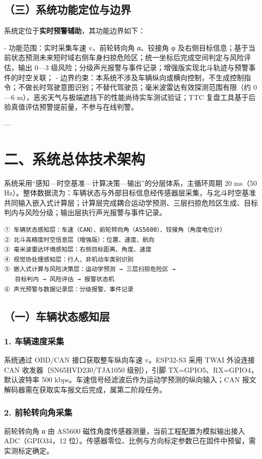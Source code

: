 \documentclass[UTF8,11pt]{ctexart}
\begin{document}
\subsection*{（三）系统功能定位与边界}
系统定位于\textbf{实时预警辅助}，其功能边界如下：

- 功能范围：实时采集车速 v、前轮转向角 α、铰接角 φ 及右侧目标信息；基于当前状态预测未来短时域右侧车身扫掠危险区；统一坐标后完成空间判定与风险评估，输出 0—3 级风险；分级声光报警与事件记录；增强版实现北斗轨迹与预警事件的时空关联； - 边界约束：本系统不涉及车辆纵向或横向控制，不生成控制指令；不做长时驾驶意图识别；不替代驾驶员；毫米波雷达有效探测范围有限（约 0—6 m），恶劣天气与极端遮挡下的性能尚待实车测试验证；TTC 复盘工具基于后验真值评估预警提前量，不参与在线判警。

---

\section*{二、系统总体技术架构}
系统采用“感知—时空基准—计算决策—输出”的分层体系，主循环周期 20 ms（50 Hz）。整体数据流为：车辆状态与外部目标信息经传感器层采集，与北斗时空基准共同输入嵌入式计算层；计算层完成耦合运动学预测、三层扫掠危险区生成、目标判内与风险分级；输出层执行声光报警与事件记录。

\begin{verbatim}
① 车辆状态感知层：车速（CAN）、前轮转向角（AS5600）、铰接角（角度电位计）
② 北斗高精度时空信息层（增强版）：位置、速度、航向
③ 毫米波雷达环境感知层：右侧目标距离、角度、速度
④ 视觉协处理感知层：行人、非机动车类别识别
⑤ 嵌入式计算与风险决策层：运动学预测 → 三层扫掠危险区 →
   目标判内 → 风险评估 → 报警状态机
⑥ 声光预警与数据记录层：分级报警、事件记录
\end{verbatim}
\subsection*{（一）车辆状态感知层}
\subsubsection*{1. 车辆速度采集}
系统通过 OBD/CAN 接口获取整车纵向车速 v。ESP32-S3 采用 TWAI 外设连接 CAN 收发器（SN65HVD230/TJA1050 级别），引脚 TX=GPIO5、RX=GPIO4，默认波特率 500 kbps。车速信号经滤波后作为运动学预测的纵向输入；CAN 报文解码器需在获取实车报文后完成，属第二阶段任务。

\subsubsection*{2. 前轮转向角采集}
前轮转向角 α 由 AS5600 磁性角度传感器测量，当前工程配置为模拟输出接入 ADC（GPIO34，12 位）。传感器零位、比例与方向标定参数已在固件中预留，需实测标定确定。
\end{document}
